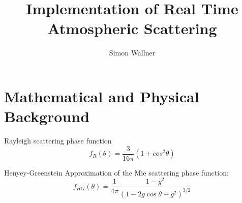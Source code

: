 \documentclass[12pt,a4paper]{scrartcl}
\author{Simon Wallner}
\title{Implementation of Real Time Atmospheric Scattering}
\begin{document}
\maketitle


\section{Mathematical and Physical Background}
Rayleigh scattering phase function \cite{Preetham03Modeling-skylight}
\begin{equation}
f_R(\theta) = \frac{3}{16\pi} (1 + cos^2\theta)
\end{equation}

Henyey-Greenstein Approximation of the Mie scattering phase function: \cite{HenyeyGreenstein41Diffuse-radiation, Preetham03Modeling-skylight}
\begin{equation}
f_{HG}(\theta) = \frac{1}{4\pi} \frac{1 - g^2}{(1 - 2g\cos \theta + g^2) ^{3/2}}
\end{equation}




\end{document}
